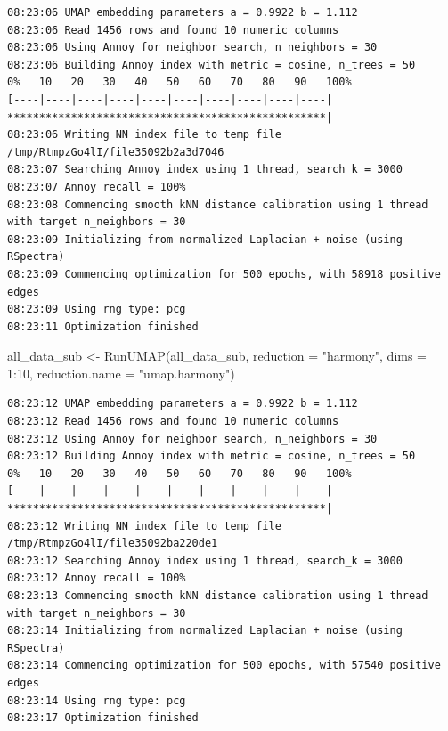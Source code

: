 \documentclass[
  letterpaper,
  DIV=11,
  numbers=noendperiod]{scrreprt}
\newenvironment{Shaded}{\begin{snugshade}}{\end{snugshade}}
\newcommand{\AttributeTok}[1]{\textcolor[rgb]{0.40,0.45,0.13}{#1}}
\newcommand{\DecValTok}[1]{\textcolor[rgb]{0.68,0.00,0.00}{#1}}
\newcommand{\FunctionTok}[1]{\textcolor[rgb]{0.28,0.35,0.67}{#1}}
\newcommand{\NormalTok}[1]{\textcolor[rgb]{0.00,0.23,0.31}{#1}}
\newcommand{\OtherTok}[1]{\textcolor[rgb]{0.00,0.23,0.31}{#1}}
\newcommand{\SpecialCharTok}[1]{\textcolor[rgb]{0.37,0.37,0.37}{#1}}
\newcommand{\StringTok}[1]{\textcolor[rgb]{0.13,0.47,0.30}{#1}}
\begin{document}
\begin{verbatim}
08:23:06 UMAP embedding parameters a = 0.9922 b = 1.112
08:23:06 Read 1456 rows and found 10 numeric columns
08:23:06 Using Annoy for neighbor search, n_neighbors = 30
08:23:06 Building Annoy index with metric = cosine, n_trees = 50
0%   10   20   30   40   50   60   70   80   90   100%
[----|----|----|----|----|----|----|----|----|----|
**************************************************|
08:23:06 Writing NN index file to temp file /tmp/RtmpzGo4lI/file35092b2a3d7046
08:23:07 Searching Annoy index using 1 thread, search_k = 3000
08:23:07 Annoy recall = 100%
08:23:08 Commencing smooth kNN distance calibration using 1 thread with target n_neighbors = 30
08:23:09 Initializing from normalized Laplacian + noise (using RSpectra)
08:23:09 Commencing optimization for 500 epochs, with 58918 positive edges
08:23:09 Using rng type: pcg
08:23:11 Optimization finished
\end{verbatim}

\begin{Shaded}
\begin{Highlighting}[]
\NormalTok{all\_data\_sub }\OtherTok{\textless{}{-}} \FunctionTok{RunUMAP}\NormalTok{(all\_data\_sub, }\AttributeTok{reduction =} \StringTok{"harmony"}\NormalTok{, }\AttributeTok{dims =} \DecValTok{1}\SpecialCharTok{:}\DecValTok{10}\NormalTok{, }\AttributeTok{reduction.name =} \StringTok{"umap.harmony"}\NormalTok{)}
\end{Highlighting}
\end{Shaded}

\begin{verbatim}
08:23:12 UMAP embedding parameters a = 0.9922 b = 1.112
08:23:12 Read 1456 rows and found 10 numeric columns
08:23:12 Using Annoy for neighbor search, n_neighbors = 30
08:23:12 Building Annoy index with metric = cosine, n_trees = 50
0%   10   20   30   40   50   60   70   80   90   100%
[----|----|----|----|----|----|----|----|----|----|
**************************************************|
08:23:12 Writing NN index file to temp file /tmp/RtmpzGo4lI/file35092ba220de1
08:23:12 Searching Annoy index using 1 thread, search_k = 3000
08:23:12 Annoy recall = 100%
08:23:13 Commencing smooth kNN distance calibration using 1 thread with target n_neighbors = 30
08:23:14 Initializing from normalized Laplacian + noise (using RSpectra)
08:23:14 Commencing optimization for 500 epochs, with 57540 positive edges
08:23:14 Using rng type: pcg
08:23:17 Optimization finished
\end{verbatim}
\end{document}
